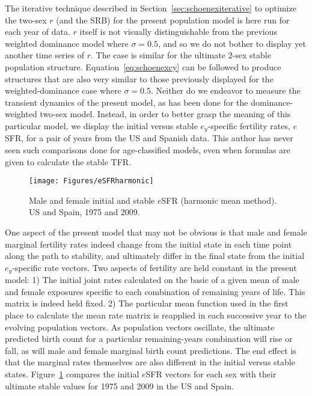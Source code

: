 \FloatBarrier
The iterative technique described in Section~\ref{sec:schoenexiterative} to
optimize the two-sex $r$ (and the SRB) for the present population model is here
run for each year of data. $r$ itself
is not visually distinguishable from the previous weighted dominance model where $\sigma = 0.5$,
and so we do not bother to display yet another time series of $r$. The case is
similar for the ultimate 2-sex stable population structure. Equation~\eqref{eq:schoenexcy} can 
be followed to produce structures that are also very similar to those
previously displayed for the weighted-dominance case where $\sigma =
0.5$. Neither do we endeavor to measure the transient dynamics of the present
model, as has been done for the dominance-weighted two-sex model. Instead, in order to better grasp the meaning of
this particular model, we display the initial versus stable $e_y$-specific fertility rates, $e$SFR, for a pair of years from the US and Spanish data. This author has never seen such comparisons done for
age-classified models, even when formulas are given to calculate the stable TFR. 

\begin{figure}[ht!]
        \centering  
          \caption{Male and female initial and stable $e$SFR (harmonic mean
          method). US and Spain, 1975 and 2009.}
           \texttt{[image: Figures/eSFRharmonic]}
          \label{fig:eSFRharmonic}
\end{figure}

One aspect of the present model that may not be obvious is that male and female marginal
fertility rates indeed change from the initial state in each time point along
the path to stability, and ultimately differ in the final state from the initial
$e_y$-specific rate vectors. Two aspects of fertility are held constant in the
present model: 1) The initial joint rates calculated on the basic of a given
mean of male and female exposures specific to each combination of remaining
years of life. This matrix is indeed held fixed. 2) The particular mean function
used in the first place to calculate the mean rate matrix is reapplied in each
successive year to the evolving population vectors. As population vectors
oscillate, the ultimate predicted birth count for a particular remaining-years
combination will rise or fall, as will male and female marginal birth count
predictions. The end effect is that the marginal rates themselves are also
different in the initial versus stable states. Figure~\ref{fig:eSFRharmonic}
compares the initial $e$SFR vectors for each sex with their ultimate stable
values for 1975 and 2009 in the US and Spain.

